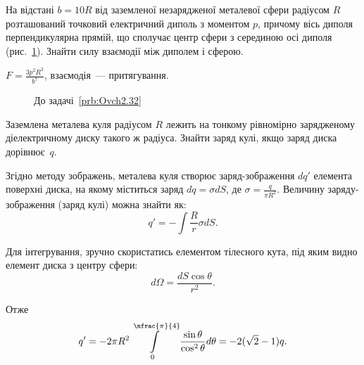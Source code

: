 \begin{problem}\label{prb:Ovch2.32}
На відстані $b= 10R$ від заземленої незарядженої металевої сфери радіусом $R$ розташований точковий електричний диполь з моментом $p$, причому вісь диполя перпендикулярна прямій, що сполучає центр сфери з серединою осі диполя (рис.~\ref{Ovch2.32}). Знайти силу взаємодії між диполем і сферою.
\begin{solution}
	$F = \frac{3p^2R^3}{b^7}$, взаємодія~--- притягування.
\end{solution}
\end{problem}
\begin{figure}[h!]\centering
	\caption{До задачі~\ref{prb:Ovch2.32}}
	\label{Ovch2.32}
\end{figure}

\begin{problem}
Заземлена металева куля радіусом $R$ лежить на тонкому рівномірно зарядженому діелектричному диску такого ж радіуса. Знайти заряд кулі, якщо заряд диска дорівнює~$q$.
\begin{solution}
	Згідно методу зображень, металева куля створює заряд-зображення $dq'$ елемента поверхні диска, на якому міститься заряд $dq = \sigma dS$, де $\sigma = \frac{q}{\pi R^2}$. Величину заряду-зображення (заряд кулі) можна знайти як:
	\[
		q' = - \int\frac{R}{r}\sigma dS.
	\]

	Для інтегрування, зручно скористатись елементом тілесного кута, під яким видно елемент диска з центру сфери:
	\[
		d\Omega = \frac{dS\cos\theta}{r^2}.
	\]

	Отже
	\[
		q' = - 2\pi R^2\int\limits_{0}^{\nfrac{\pi}{4}} \frac{\sin\theta}{\cos^2\theta}d\theta = -2(\sqrt2 - 1)q.
	\]
\end{solution}
\end{problem}


